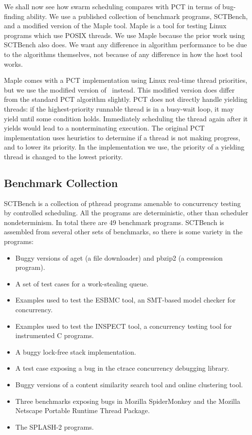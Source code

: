 We shall now see how swarm scheduling compares with PCT in terms of
bug-finding ability.  We use a published collection of benchmark
programs, SCTBench\cite{thomson2016,thomson2014}, and a modified
version of the Maple tool\cite{yu2012}.  Maple is a tool for testing
Linux programs which use POSIX threads\cite{ieee1995}.  We use Maple
because the prior work using SCTBench also does.  We want any
difference in algorithm performance to be due to the algorithms
themselves, not because of any difference in how the host tool works.

Maple comes with a PCT implementation using Linux real-time thread priorities,
but we use the modified version of~\cite{thomson2016} instead.  This modified
version does differ from the standard PCT algorithm slightly.  PCT does not
directly handle yielding threads: if the highest-priority runnable thread is in
a busy-wait loop, it may yield until some condition holds.  Immediately
scheduling the thread again after it yields would lead to a nonterminating
execution.  The original PCT implementation uses heuristics to determine if a
thread is not making progress, and to lower its priority\cite{burckhardt2010}.
In the implementation we use, the priority of a yielding thread is changed to
the lowest priority\cite{thomson2016}.

\subsection{Benchmark Collection}
\label{sec:algorithms-bench-sctbench}

SCTBench\cite{thomson2016,thomson2014} is a collection of pthread
programs amenable to concurrency testing by controlled scheduling.
All the programs are deterministic, other than scheduler
nondeterminism.  In total there are 49 benchmark programs.  SCTBench
is assembled from several other sets of benchmarks, so there is some
variety in the programs:

\begin{itemize}
\item Buggy versions of aget (a file downloader) and pbzip2 (a compression
program).
\item A set of test cases for a work-stealing queue.
\item Examples used to test the ESBMC tool\cite{cordeiro2011}, an SMT-based
model checker for concurrency.
\item Examples used to test the INSPECT tool\cite{yang2008}, a concurrency
testing tool for instrumented C programs.
\item A buggy lock-free stack implementation.
\item A test case exposing a bug in the ctrace\cite{mcpherson2003}
  concurrency debugging library.
\item Buggy versions of a content similarity search tool and online clustering
tool.
\item Three benchmarks exposing bugs in Mozilla
  SpiderMonkey\cite{eich1996} and the Mozilla Net\-scape Portable
  Runtime Thread Package\cite{mozilla1996}.
\item The SPLASH-2 programs\cite{woo1995}.
\end{itemize}

